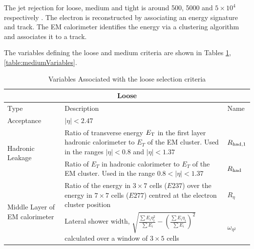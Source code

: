 \documentclass{article}
\begin{document}
The jet rejection for loose, medium and tight is around 500, 5000 and $5\times10^4$  respectively \cite{ElectronPerformanceMeasurements}. The electron is reconstructed by associating an energy signature and track. The EM calorimeter identifies the energy via a clustering algorithm and associates it to a track. 

The variables defining the loose and medium criteria are shown in Tables \ref{table:looseVariables}, \ref{table:mediumVariables}.

\begin{table}[h!t]
\caption{ Variables Associated with the loose selection criteria \cite{ElectronPerformanceMeasurements}\label{table:looseVariables}}
\begin{tabular}{|p{5cm}|p{8cm}|p{1cm}| } 
\hline
\multicolumn{3}{|c|}{\textbf{Loose}}		\\\hline
Type&Description&Name		    \\\hline
Acceptance &  $|\eta|<2.47$ &  	\\\hline
\multirow{2}{*}{Hadronic Leakage} & Ratio of transverse energy $E_{\rm{T}}$ in the first layer hadronic calorimeter to $E_T$ of the EM cluster. Used in the ranges $|\eta|<0.8$ and $|\eta|<1.37$ & $R_{\rm{had,1}}$ \\\cline{2-3}
& Ratio of $E_T$ in hadronic calorimeter to $E_T$ of the EM cluster. Used in the range $0.8<|\eta|<1.37$ & $R_{\rm{had}}$\\\hline
\multirow{2}{*}{Middle Layer of EM calorimeter} & Ratio of the energy in $3\times7$ cells ($E237$) over the energy in $7\times7$ cells ($E277$) centred at the electron cluster position & $R_{\eta}$ \\\cline{2-3}
& Lateral shower width, $ \sqrt{\frac{\sum E_i \eta_{i}^{2}}{\sum E_i} - \left( \frac{\sum E_i \eta_i}{\sum E_i} \right)^2 }$ calculated over a window of $3\times5$ cells & $\omega_{\eta^2}$ \\\hline
\end{tabular}
\end{table}
\end{document}
